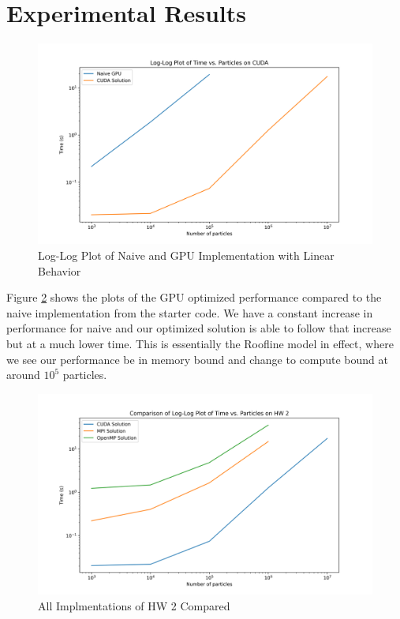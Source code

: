 \documentclass{article}
\begin{document}
\section{Experimental Results}

\begin{figure}[H]
    \centerline{\includegraphics[width=6in]{figures/log-log.png}}
    \caption{Log-Log Plot of Naive and GPU Implementation with Linear Behavior}
    \label{fig:log-log}
\end{figure}


Figure \ref{fig:compare} shows the plots of the GPU optimized performance compared to the naive implementation from the starter code. We have a constant increase in performance for naive and our optimized solution is able to follow that increase but at a much lower time. This is essentially the Roofline model in effect, where we see our performance be in memory bound and change to compute bound at around $10^5$ particles.

\begin{figure}[H]
    \centerline{\includegraphics[width=6in]{figures/hw2-compare.png}}
    \caption{All Implmentations of HW 2 Compared}
    \label{fig:compare}
\end{figure}
\end{document}

